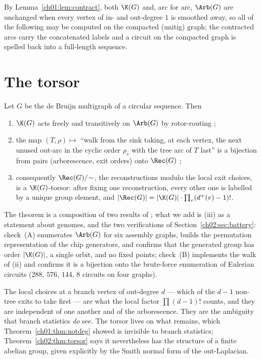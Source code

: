 By Lemma~\ref{ch01:lem:contract}, both $\K(G)$ and, arc for arc, $\Arb(G)$
are unchanged when every vertex of in- and out-degree $1$ is smoothed away, so all of the
following may be computed on the compacted (unitig) graph; the contracted arcs carry the
concatenated labels and a circuit on the compacted graph is spelled back into a
full-length sequence.

\section{The torsor}\label{ch02:sec:torsor}

\begin{theorem}\label{ch02:thm:torsor}
Let $G$ be the de Bruijn multigraph of a circular sequence. Then
\begin{enumerate}
\item[(i)] $\K(G)$ acts freely and transitively on $\Arb(G)$ by rotor-routing
{\rm\cite[Lem.~3.12, 3.13, 3.17]{HLMPPW}};
\item[(ii)] the map $(T,\rho)\mapsto$ ``walk from the sink taking, at each vertex, the
next unused out-arc in the cyclic order $\rho_v$ with the tree arc of $T$ last'' is a
bijection from pairs (arborescence, exit orders) onto $\Rec(G)$
{\rm\cite[Cor.~4.10]{HLMPPW}};
\item[(iii)] consequently $\Rec(G)/\!\sim$, the reconstructions modulo the local exit
choices, is a $\K(G)$-torsor: after fixing one reconstruction, every other one is labelled
by a unique group element, and $|\Rec(G)|=|\K(G)|\cdot\prod_v(d^+(v)-1)!$.
\end{enumerate}
\end{theorem}

The theorem is a composition of two results of \cite{HLMPPW}; what we add is (iii) as a
statement about genomes, and the two verifications of Section~\ref{ch02:sec:battery}: check~(A)
enumerates $\Arb(G)$ for six assembly graphs, builds the permutation representation of the
chip generators, and confirms that the generated group has order $|\K(G)|$, a single orbit,
and no fixed points; check~(B) implements the walk of (ii) and confirms it is a bijection
onto the brute-force enumeration of Eulerian circuits ($288$, $576$, $144$, $8$ circuits on
four graphs).

\begin{remark}\label{ch02:rem:quotient}
The local choices at a branch vertex of out-degree $d$ --- which of the $d-1$ non-tree
exits to take first --- are what the local factor $\prod(d-1)!$ counts, and they are
independent of one another and of the arborescence. They are the ambiguity that branch
statistics \emph{do} see. The torsor lives on what remains, which Theorem~\ref{ch01:thm:notdeg} showed is
invisible to branch statistics; Theorem~\ref{ch02:thm:torsor} says it nevertheless has the
structure of a finite abelian group, given explicitly by the Smith normal form of the
out-Laplacian.
\end{remark}

